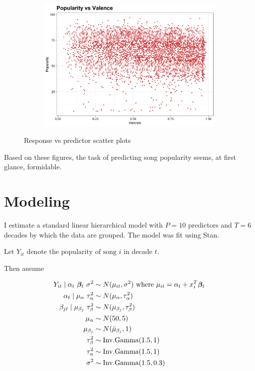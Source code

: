 \documentclass[12pt, twoside]{article}
\begin{document}
\begin{figure}[H]
\begin{subfigure}[b]{0.5\textwidth}
\caption{}
\label{fig:duration_trend}
\end{subfigure}
\begin{subfigure}[b]{0.5\textwidth}
\centering
\includegraphics[width = \textwidth]{pop_vs_track_valence.png}
\caption{}
\label{fig:duration_trend}
\end{subfigure}
\caption{Response vs predictor scatter plots}
\end{figure}

Based on these figures, the task of predicting song popularity seems, at first glance, formidable. 

\section{Modeling}

I estimate a standard linear hierarchical model with $P=10$ predictors and $T=6$ decades by which the data are grouped. The model was fit using Stan. 

$\text{Let } Y_{it} \text{ denote the popularity of song } i \text{ in decade } t$. 

Then assume

\begin{align*}
Y_{it} \mid \alpha_t \ \bm{\beta}_{t} \ \sigma^2 & \sim N(\mu_{it}, \sigma^2) \text{ where } \mu_{it} = \alpha_t + x_i^T\bm{\beta}_{t} \\
\alpha_t \mid \mu_\alpha \ \tau_\alpha^2 & \sim N(\mu_{\alpha}, \tau^2_\alpha) \\
\beta_{jt} \mid \mu_{\beta_j} \ \tau_{\beta}^2 & \sim N(\mu_{\beta_j}, \tau_\beta^2) \\
\mu_\alpha & \sim N(50, 5) \\
\mu_{\beta_j} & \sim N(\Bar{\mu}_{\beta_{j}}, 1) \\
\tau_\beta^2 & \sim \text{Inv.Gamma}(1.5, 1) \\
\tau_\alpha^2 & \sim \text{Inv.Gamma}(1.5, 1) \\
\sigma^2 & \sim \text{Inv.Gamma}(1.5, 0.3)
\end{align*}
\end{document}
